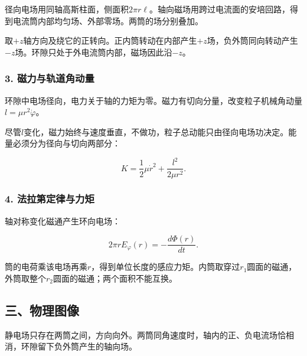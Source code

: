 \documentclass[12pt,a4paper,fontset=fandol]{ctexart}
\begin{document}
径向电场用同轴高斯柱面，侧面积\(2\pi r\ell\)。轴向磁场用跨过电流面的安培回路，得到电流筒内部均匀场、外部零场。两筒的场分别叠加。

取\(+z\)轴方向及绕它的正转向。正内筒转动在内部产生\(+z\)场，负外筒同向转动产生\(-z\)场。环隙只处于外电流筒内部，磁场因此沿\(-z\)。

\subsubsection{3.
磁力与轨道角动量}\label{ux78c1ux529bux4e0eux8f68ux9053ux89d2ux52a8ux91cf}

环隙中电场径向，电力关于轴的力矩为零。磁力有切向分量，改变粒子机械角动量\(l=\mu r^2\dot\varphi\)。

尽管\(l\)变化，磁力始终与速度垂直，不做功，粒子总动能只由径向电场功决定。能量必须分为径向与切向两部分：

\[
K=\frac12\mu\dot r^2+\frac{l^2}{2\mu r^2}.
\]

\subsubsection{4.
法拉第定律与力矩}\label{ux6cd5ux62c9ux7b2cux5b9aux5f8bux4e0eux529bux77e9}

轴对称变化磁通产生环向电场：

\[
2\pi rE_\varphi(r)=-\frac{d\Phi(r)}{dt}.
\]

筒的电荷乘该电场再乘\(r\)，得到单位长度的感应力矩。内筒取穿过\(r_1\)圆面的磁通，外筒取整个\(r_2\)圆面的磁通；两个面积不能互换。

\subsection{三、物理图像}\label{ux4e09ux7269ux7406ux56feux50cf-5}

静电场只存在两筒之间，方向向外。两筒同角速度时，轴内的正、负电流场恰相消，环隙留下负外筒产生的轴向场。

\begin{center}
\begin{minipage}{\linewidth}
\centering\begingroup{}
\ifdim\wd\diagrambox>.88\linewidth
\sbox{\diagrambox}{\resizebox{.88\linewidth}{!}{\usebox{\diagrambox}}}\fi
\ifdim\ht\diagrambox>.38\textheight
\resizebox{!}{.38\textheight}{\usebox{\diagrambox}}
\else\usebox{\diagrambox}\fi
\par{}\endgroup\end{minipage}\end{center}
\end{document}
